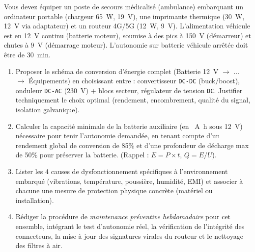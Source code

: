 \documentclass[11pt]{article}
\begin{document}
\begin{exercice}
Vous devez équiper un poste de secours médicalisé (ambulance) embarquant un ordinateur portable (chargeur \SI{65}{\watt}, \SI{19}{\volt}), une imprimante thermique (\SI{30}{\watt}, \SI{12}{\volt} via adaptateur) et un routeur 4G/5G (\SI{12}{\watt}, \SI{9}{\volt}). L'alimentation véhicule est en \SI{12}{\volt} continu (batterie moteur), soumise à des pics à \SI{150}{\volt} (démarreur) et chutes à \SI{9}{\volt} (démarrage moteur). L'autonomie sur batterie véhicule arrêtée doit être de \SI{30}{\minute}.
\begin{enumerate}
    \item Proposer le schéma de conversion d'énergie complet (Batterie \SI{12}{\volt} $\rightarrow$ ... $\rightarrow$ Équipements) en choisissant entre : convertisseur \texttt{DC-DC} (buck/boost), onduleur \texttt{DC-AC} (\SI{230}{\volt}) + blocs secteur, régulateur de tension \texttt{DC}. Justifier techniquement le choix optimal (rendement, encombrement, qualité du signal, isolation galvanique).
    \item Calculer la capacité minimale de la batterie auxiliaire (en \SI{}{\ampere\hour} sous \SI{12}{\volt}) nécessaire pour tenir l'autonomie demandée, en tenant compte d'un rendement global de conversion de 85\% et d'une profondeur de décharge max de 50\% pour préserver la batterie. (Rappel : $E = P \times t$, $Q = E / U$).
    \item Lister les 4 causes de dysfonctionnement spécifiques à l'environnement embarqué (vibrations, température, poussière, humidité, EMI) et associer à chacune une mesure de protection physique concrète (matériel ou installation).
    \item Rédiger la procédure de \textit{maintenance préventive hebdomadaire} pour cet ensemble, intégrant le test d'autonomie réel, la vérification de l'intégrité des connecteurs, la mise à jour des signatures virales du routeur et le nettoyage des filtres à air.
\end{enumerate}
\end{exercice}
\end{document}
